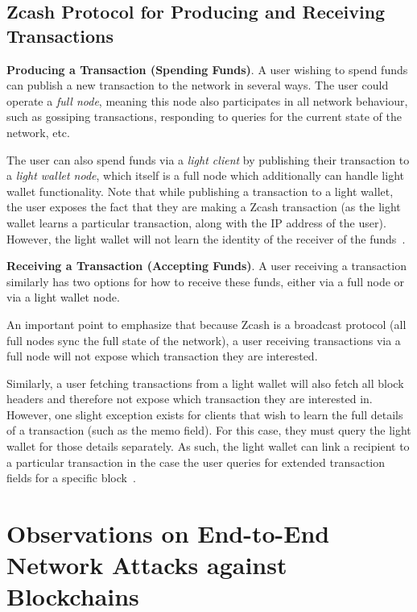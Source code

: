 \documentclass{article}
\begin{document}
\subsection{Zcash Protocol for Producing and Receiving Transactions}

\textbf{Producing a Transaction (Spending Funds)}.
A user wishing to spend
funds can publish a new transaction to the network in several ways. The user
could operate a \emph{full node}, meaning this node also participates in all
network behaviour, such as gossiping transactions, responding to queries for
the current state of the network, etc.

The user can also spend funds via a \emph{light
client} by publishing their transaction to a
\emph{light wallet node}, which itself is a full node which additionally can handle
light wallet functionality. Note that while publishing a transaction to a light
wallet, the user exposes the fact that they are making a Zcash transaction (as
the light wallet learns a particular transaction, along with the IP address of
the user). However, the light wallet will not learn the identity of the
receiver of the funds~\cite{light-wallet-spec}.

\textbf{Receiving a Transaction (Accepting Funds)}. A user receiving a
transaction similarly has two options for how to receive these funds, either
via a full node or via a light wallet node.

An important point to emphasize that because Zcash is a broadcast protocol (all
full nodes sync the full state of the network), a user receiving transactions
via a full node will not expose which transaction they are interested.

Similarly, a user fetching transactions from a light wallet will also fetch all
block headers and therefore not expose which transaction they are interested
in. However, one slight exception exists for clients that wish
to learn the full details of a transaction (such as the memo field). For this
case,
they must query the light wallet for those details separately. As such, the
light wallet can link a recipient to a particular transaction in the case the
user queries for extended transaction fields for a specific block~\cite{light-wallet-spec}.

\section{Observations on End-to-End Network Attacks against Blockchains}
\label{observations}
\end{document}

